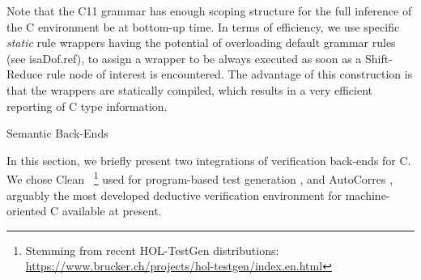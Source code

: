 \begin{isabellebody}
\begin{isamarkuptext}
Note that the C11 grammar has enough scoping structure for the full inference of the C environment
 be at bottom-up time. In terms of efficiency, we use specific
\emph{static} rule wrappers having the potential of overloading default grammar rules (see \csname isaDof.ref), to assign a wrapper to be always executed as soon as a Shift-Reduce
rule node of interest is encountered. The advantage of this construction is that the wrappers are
statically compiled, which results in a very efficient reporting of C type information.%
\end{isamarkuptext}\isamarkuptrue%
%
\begin{isamarkupsection*}%
[label = {backends},type = {scholarly_paper.technical}, args={label = {backends},type = {scholarly_paper.technical}, Isa_COL.text_element.level = {}, Isa_COL.text_element.referentiable = {False}, Isa_COL.text_element.variants = {{STR ''outline'', STR ''document''}}, scholarly_paper.text_section.main_author = {}, scholarly_paper.text_section.fixme_list = {}, Isa_COL.text_element.level = {}, scholarly_paper.technical.definition_list = {}}]Semantic Back-Ends%
\end{isamarkupsection*}\isamarkuptrue%
%
\begin{isamarkuptext}%
In this section, we briefly present two integrations of verification back-ends for C. We
chose Clean \cite{journals/afp/TuongW19}~\footnote{Stemming from recent HOL-TestGen distributions:
    \url{https://www.brucker.ch/projects/hol-testgen/index.en.html}} used
for program-based test generation \cite{DBLP:conf/tap/Keller18}, and AutoCorres \cite{DBLP:conf/pldi/GreenawayLAK14}, arguably the most developed deductive verification environment
for machine-oriented C available at present.


\end{isamarkuptext}
\end{isabellebody}
